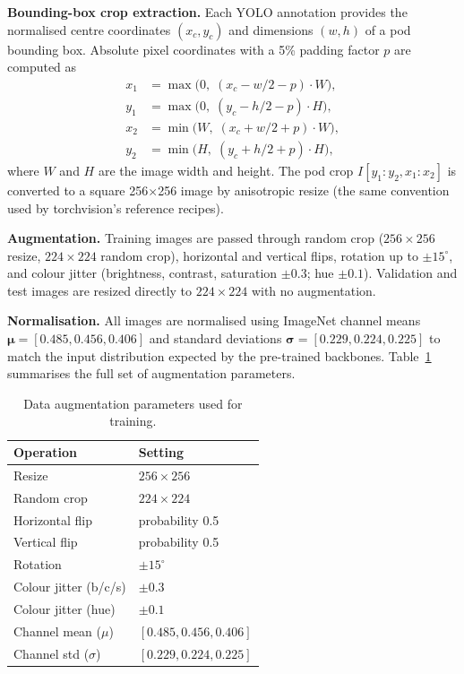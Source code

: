 \documentclass[conference,10pt]{IEEEtran}
\begin{document}
\textbf{Bounding-box crop extraction.}
Each YOLO annotation provides the normalised centre coordinates $(x_c,y_c)$
and dimensions $(w,h)$ of a pod bounding box. Absolute pixel coordinates with
a 5\% padding factor $p$ are computed as
\begin{align}
x_1 &= \max\!\bigl(0,\;(x_c - w/2 - p)\cdot W\bigr),\\
y_1 &= \max\!\bigl(0,\;(y_c - h/2 - p)\cdot H\bigr),\\
x_2 &= \min\!\bigl(W,\;(x_c + w/2 + p)\cdot W\bigr),\\
y_2 &= \min\!\bigl(H,\;(y_c + h/2 + p)\cdot H\bigr),
\end{align}
where $W$ and $H$ are the image width and height. The pod crop $I[y_1{:}y_2,
x_1{:}x_2]$ is converted to a square 256$\times$256 image by anisotropic
resize (the same convention used by torchvision's reference recipes).

\textbf{Augmentation.} Training images are passed through random crop
($256\!\times\!256$ resize, $224\!\times\!224$ random crop), horizontal and
vertical flips, rotation up to $\pm15^\circ$, and colour jitter (brightness,
contrast, saturation $\pm0.3$; hue $\pm0.1$). Validation and test images are
resized directly to $224\!\times\!224$ with no augmentation.

\textbf{Normalisation.} All images are normalised using ImageNet channel
means $\boldsymbol{\mu}=[0.485,0.456,0.406]$ and standard deviations
$\boldsymbol{\sigma}=[0.229,0.224,0.225]$ to match the input distribution
expected by the pre-trained backbones. Table~\ref{tab:augparams} summarises
the full set of augmentation parameters.

\begin{table}[t]
\centering
\caption{Data augmentation parameters used for training.}
\label{tab:augparams}
\renewcommand{\arraystretch}{1.15}
\begin{tabular}{ll}
\toprule
\textbf{Operation} & \textbf{Setting} \\
\midrule
Resize                 & $256\times256$ \\
Random crop            & $224\times224$ \\
Horizontal flip        & probability 0.5 \\
Vertical flip          & probability 0.5 \\
Rotation               & $\pm15^\circ$ \\
Colour jitter (b/c/s)  & $\pm0.3$ \\
Colour jitter (hue)    & $\pm0.1$ \\
Channel mean ($\mu$)   & $[0.485,0.456,0.406]$ \\
Channel std ($\sigma$) & $[0.229,0.224,0.225]$ \\
\bottomrule
\end{tabular}
\end{table}
\end{document}
